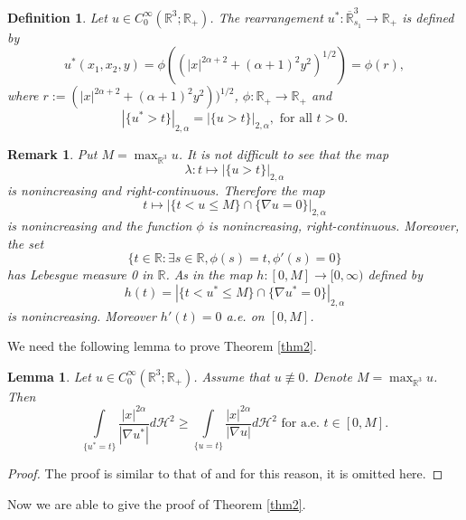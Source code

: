 \documentclass[10pt, reqno]{amsart}
\newtheorem{lemma}{Lemma}
\newtheorem{definition}{Definition}
\newtheorem{remark}{Remark}
\begin{document}
	
	\begin{definition}\label{def4}
		Let $u \in C_0^\infty (\mathbb{R}^3; \mathbb{R}_+)$. The rearrangement $u^* : \overline{\mathbb{R}}^3_{s_1} \to \mathbb{R}_+$ is defined by
		$$u^* (x_1,x_2,y) = \phi((|x|^{2\alpha+2} + (\alpha+1)^2y^2)^{1/2}) = \phi(r),$$
		where $r:= (|x|^{2\alpha+2} + (\alpha+1)^2y^2))^{1/2}$, $\phi: \mathbb{R}_+ \to \mathbb{R}_+$ and
		$$ \left| \{u^* > t\}\right|_{2,\alpha} = \left|\{u > t\}\right|_{2,\alpha}, \textrm{ for all } t>0. $$
	\end{definition}
	\begin{remark}\label{rem2}
		Put $M = \max_{\mathbb{R}^3} u$. It is not difficult to see that the map
		$$\lambda : t \mapsto |\{u>t\}|_{2,\alpha}$$
		is nonincreasing and right-continuous. Therefore the map
		$$ t \mapsto |\{t < u \leq  M\} \cap \{\nabla u = 0\}|_{2,\alpha} $$
		is nonincreasing and the function $\phi$ is nonincreasing, right-continuous. Moreover, the set
		$$ \{t \in \mathbb{R} : \exists s \in \mathbb{R}, \phi(s) = t, \phi'(s) = 0\} $$
		has Lebesgue measure 0 in $\mathbb{R}$. As in \cite{cia} the map $h : [0, M] \to [0, \infty)$ defined by
		$$h(t) = |\{t < u^* \leq M\} \cap \{\nabla u^* = 0\}|_{2,\alpha}$$
		is nonincreasing. Moreover $h'(t) = 0$ a.e. on $[0, M]$.
	\end{remark}
	
	We need the following lemma to prove Theorem \ref{thm2}.
	\begin{lemma}\label{lem1}
		Let $u \in C^\infty_0 (\mathbb{R}^3; \mathbb{R}_+)$. Assume that $u \not\equiv 0$. Denote $M = \max_{\mathbb{R}^3} u$. Then
		\begin{equation}\label{eqn8}
			\int\limits_{\{u^* =t\}} \dfrac{|x|^{2\alpha}}{|\nabla u^*|} d\mathcal{H}^2 \geq \int\limits_{\{u =t\}} \dfrac{|x|^{2\alpha}}{|\nabla u|} d\mathcal{H}^2 \textrm{ for a.e. } t\in [0,M].
		\end{equation}
	\end{lemma}
	
	\begin{proof}
		The proof is similar to that of \cite[Lemma 1]{nga} and for this reason, it is omitted here.
	\end{proof}
	
	Now we are able to give the proof of Theorem \ref{thm2}.
	
\end{document}
